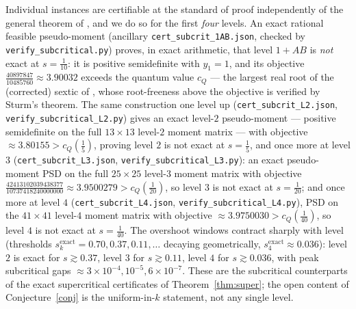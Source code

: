 \documentclass[11pt]{article}
\begin{document}
Individual instances are certifiable at the standard of proof independently of
the general theorem of \cite{proof}, and we do so for the first \emph{four}
levels. An exact
rational feasible pseudo-moment (ancillary \texttt{cert\_subcrit\_1AB.json},
checked by \texttt{verify\_subcritical.py}) proves, in exact arithmetic, that
level $1{+}AB$ is \emph{not} exact at $s=\tfrac1{10}$: it is positive
semidefinite with $y_1=1$, and its objective $\tfrac{40897847}{10485760}\approx
3.90032$ exceeds the quantum value $c_Q$ --- the largest real root of the
(corrected) sextic of \cite{Gigena}, whose root-freeness above the objective is
verified by Sturm's theorem. The same construction one level up
(\texttt{cert\_subcrit\_L2.json}, \texttt{verify\_subcritical\_L2.py}) gives an
exact level-$2$ pseudo-moment --- positive semidefinite on the full $13\times13$
level-$2$ moment matrix --- with objective $\approx3.80155>c_Q(\tfrac15)$,
proving level $2$ is not exact at $s=\tfrac15$, and once more at level $3$
(\texttt{cert\_subcrit\_L3.json}, \texttt{verify\_subcritical\_L3.py}): an exact
pseudo-moment PSD on the full $25\times25$ level-$3$ moment matrix with objective
$\tfrac{42413102039438377}{10737418240000000}\approx3.9500279>c_Q(\tfrac1{20})$,
so level $3$ is not exact at $s=\tfrac1{20}$; and once more at level $4$
(\texttt{cert\_subcrit\_L4.json}, \texttt{verify\_subcritical\_L4.py}), PSD on the
$41\times41$ level-$4$ moment matrix with objective $\approx3.9750030>c_Q(\tfrac1{40})$,
so level $4$ is not exact at $s=\tfrac1{40}$. The overshoot windows contract
sharply with level (thresholds
$s^{\mathrm{exact}}_k=0.70,0.37,0.11,\ldots$ decaying geometrically,
$s^{\mathrm{exact}}_4\approx0.036$): level $2$ is exact for
$s\gtrsim0.37$, level $3$ for $s\gtrsim0.11$, level $4$ for
$s\gtrsim0.036$, with peak subcritical
gaps $\approx3\times10^{-4},10^{-5},6\times10^{-7}$. These are
the subcritical counterparts of the exact supercritical certificates of
Theorem~\ref{thm:super}; the open content of Conjecture~\ref{conj} is the
uniform-in-$k$ statement, not any single level.
\end{document}
